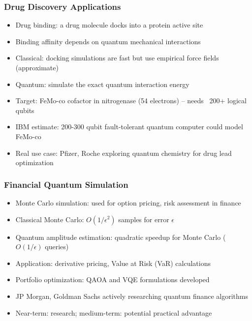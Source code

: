 \begin{frame}[fragile]\frametitle{Drug Discovery Applications}
\begin{itemize}
\item Drug binding: a drug molecule docks into a protein active site
\item Binding affinity depends on quantum mechanical interactions
\item Classical: docking simulations are fast but use empirical force fields (approximate)
\item Quantum: simulate the exact quantum interaction energy
\item Target: FeMo-co cofactor in nitrogenase (54 electrons) -- needs ~200+ logical qubits
\item IBM estimate: 200-300 qubit fault-tolerant quantum computer could model FeMo-co
\item Real use case: Pfizer, Roche exploring quantum chemistry for drug lead optimization
\end{itemize}
\end{frame}

\begin{frame}[fragile]\frametitle{Financial Quantum Simulation}
\begin{itemize}
\item Monte Carlo simulation: used for option pricing, risk assessment in finance
\item Classical Monte Carlo: $O(1/\epsilon^2)$ samples for error $\epsilon$
\item Quantum amplitude estimation: quadratic speedup for Monte Carlo ($O(1/\epsilon)$ queries)
\item Application: derivative pricing, Value at Risk (VaR) calculations
\item Portfolio optimization: QAOA and VQE formulations developed
\item JP Morgan, Goldman Sachs actively researching quantum finance algorithms
\item Near-term: research; medium-term: potential practical advantage
\end{itemize}
\end{frame}

